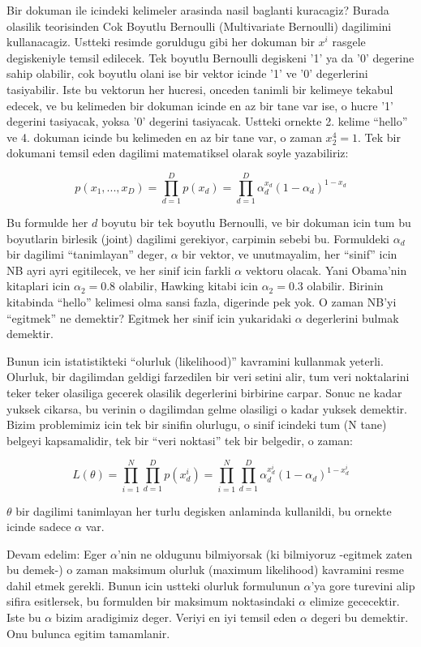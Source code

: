 \documentclass[12pt,fleqn]{article}\usepackage{../common}
\begin{document}
Bir dokuman ile icindeki kelimeler arasinda nasil baglanti kuracagiz?
Burada olasilik teorisinden Cok Boyutlu Bernoulli (Multivariate Bernoulli)
dagilimini kullanacagiz. Ustteki resimde goruldugu gibi her dokuman bir
$x^i$ rasgele degiskeniyle temsil edilecek. Tek boyutlu Bernoulli degiskeni
'1' ya da '0' degerine sahip olabilir, cok boyutlu olani ise bir vektor
icinde '1' ve '0' degerlerini tasiyabilir. Iste bu vektorun her hucresi,
onceden tanimli bir kelimeye tekabul edecek, ve bu kelimeden bir dokuman
icinde en az bir tane var ise, o hucre '1' degerini tasiyacak, yoksa '0'
degerini tasiyacak. Ustteki ornekte 2. kelime ``hello'' ve 4. dokuman
icinde bu kelimeden en az bir tane var, o zaman $x_2^4 = 1$. Tek bir
dokumani temsil eden dagilimi matematiksel olarak soyle yazabiliriz:

\[ p(x_1,...,x_{D}) = \prod_{d=1}^{D} p(x_d)=\prod_{d=1}^{D}
\alpha_d^{x_d}(1-\alpha_d)^{1-x_d} 
 \]

 Bu formulde her $d$ boyutu bir tek boyutlu Bernoulli, ve bir dokuman icin
 tum bu boyutlarin birlesik (joint) dagilimi gerekiyor, carpimin sebebi
 bu. Formuldeki $\alpha_d$ bir dagilimi ``tanimlayan'' deger, $\alpha$ bir
 vektor, ve unutmayalim, her ``sinif'' icin NB ayri ayri egitilecek, ve her
 sinif icin farkli $\alpha$ vektoru olacak. Yani Obama'nin kitaplari icin
 $\alpha_2 = 0.8$ olabilir, Hawking kitabi icin $\alpha_2 = 0.3$
 olabilir. Birinin kitabinda ``hello'' kelimesi olma sansi fazla, digerinde
 pek yok. O zaman NB'yi ``egitmek'' ne demektir? Egitmek her sinif icin
 yukaridaki $\alpha$ degerlerini bulmak demektir.

 Bunun icin istatistikteki ``olurluk (likelihood)'' kavramini kullanmak
 yeterli. Olurluk, bir dagilimdan geldigi farzedilen bir veri setini alir,
 tum veri noktalarini teker teker olasiliga gecerek olasilik degerlerini
 birbirine carpar. Sonuc ne kadar yuksek cikarsa, bu verinin o dagilimdan
 gelme olasiligi o kadar yuksek demektir. Bizim problemimiz icin tek bir
 sinifin olurlugu, o sinif icindeki tum (N tane) belgeyi kapsamalidir, tek
 bir ``veri noktasi'' tek bir belgedir, o zaman:

\[ L(\theta) = \prod_{i=1}^N \prod_{d=1}^{D} p(x_d^i) = 
\prod_{i=1}^N \prod_{d=1}^{D} \alpha_d^{x_d^i}(1-\alpha_d)^{1-x_d^i}
 \]

$\theta$ bir dagilimi tanimlayan her turlu degisken anlaminda kullanildi, bu
ornekte icinde sadece $\alpha$ var.

Devam edelim: Eger $\alpha$'nin ne oldugunu bilmiyorsak (ki bilmiyoruz
-egitmek zaten bu demek-) o zaman maksimum olurluk (maximum likelihood)
kavramini resme dahil etmek gerekli. Bunun icin ustteki olurluk formulunun
$\alpha$'ya gore turevini alip sifira esitlersek, bu formulden bir maksimum
noktasindaki $\alpha$ elimize gececektir. Iste bu $\alpha$ bizim aradigimiz
deger. Veriyi en iyi temsil eden $\alpha$ degeri bu demektir. Onu bulunca
egitim tamamlanir.
\end{document}
